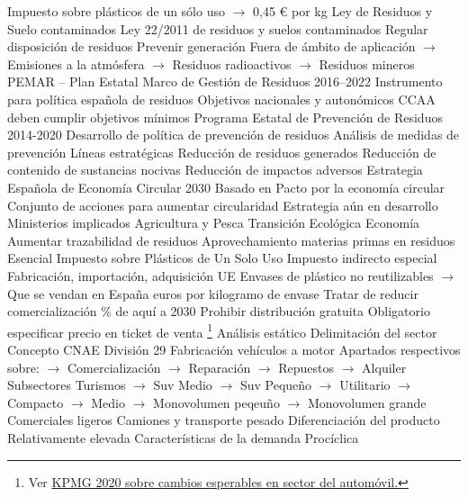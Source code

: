 \documentclass{nuevotema}
\begin{document}
\begin{esquemal}
				\4[] Impuesto sobre plásticos de un sólo uso
				\4[] $\to$ 0,45 € por kg
			\3 Ley de Residuos y Suelo contaminados
				\4 Ley 22/2011 de residuos y suelos contaminados
				\4[] Regular disposición de residuos
				\4[] Prevenir generación
				\4[] Fuera de ámbito de aplicación
				\4[] $\to$ Emisiones a la atmósfera
				\4[] $\to$ Residuos radioactivos
				\4[] $\to$ Residuos mineros
			\3 PEMAR -- Plan Estatal Marco de Gestión de Residuos 2016--2022
				\4 Instrumento para política española de residuos
				\4 Objetivos nacionales y autonómicos
				\4 CCAA deben cumplir objetivos mínimos
			\3 Programa Estatal de Prevención de Residuos 2014-2020
				\4 Desarrollo de política de prevención de residuos
				\4 Análisis de medidas de prevención
				\4 Líneas estratégicas
				\4[] Reducción de residuos generados
				\4[] Reducción de contenido de sustancias nocivas
				\4[] Reducción de impactos adversos
			\3 Estrategia Española de Economía Circular 2030
				\4 Basado en Pacto por la economía circular
				\4[] Conjunto de acciones para aumentar circularidad
				\4 Estrategia aún en desarrollo
				\4 Ministerios implicados
				\4[] Agricultura y Pesca
				\4[] Transición Ecológica
				\4[] Economía
				\4 Aumentar trazabilidad de residuos
				\4 Aprovechamiento materias primas en residuos
				\4 Esencial
			\3 Impuesto sobre Plásticos de Un Solo Uso
				\4 Impuesto indirecto especial
				\4 Fabricación, importación, adquisición UE
				\4[] Envases de plástico no reutilizables
				\4[] $\to$ Que se vendan en España
				 euros por kilogramo de envase
				\4 Tratar de reducir comercialización
				\% de aquí a 2030
				\4 Prohibir distribución gratuita
				\4 Obligatorio especificar precio en ticket de venta
	\1 \footnote{Ver \href{https://www.tendencias.kpmg.es/2019/02/claves-automocion-2019/}{KPMG 2020 sobre cambios esperables en sector del automóvil.}}
		\2 Análisis estático
			\3 Delimitación del sector
				\4 Concepto
				\4[] CNAE División 29 Fabricación vehículos a motor
				\4[] Apartados respectivos sobre:
				\4[] $\to$ Comercialización
				\4[] $\to$ Reparación
				\4[] $\to$ Repuestos
				\4[] $\to$ Alquiler
				\4 Subsectores
				\4[] Turismos
				\4[] $\to$ Suv Medio
				\4[] $\to$ Suv Pequeño
				\4[] $\to$ Utilitario
				\4[] $\to$ Compacto
				\4[] $\to$ Medio
				\4[] $\to$ Monovolumen peqeuño
				\4[] $\to$ Monovolumen grande
				\4[] Comerciales ligeros
				\4[] Camiones y transporte pesado
				\4 Diferenciación del producto
				\4[] Relativamente elevada
				\4 Características de la demanda
				\4[] Procíclica

\end{esquemal}
\end{document}
